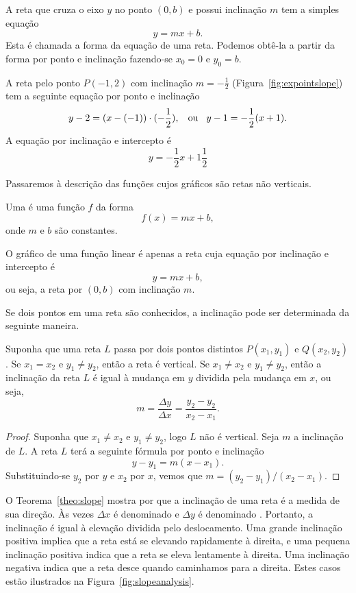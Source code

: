 \documentclass{svmono}
\begin{document}
A reta que cruza o eixo $y$ no ponto $(0,b)$ e possui inclinação $m$
tem a simples equação
\[
  y = mx + b.
\]
Esta é chamada a forma %
%
da equação de uma reta. Podemos obtê-la a partir da forma por
ponto e inclinação fazendo-se $x_0 = 0$ e $y_0 = b$.

\begin{example}
A reta pelo ponto $P(-1,2)$ com inclinação $m = - \frac{1}{2}$
(Figura~\ref{fig:expointslope}) tem a seguinte equação por
ponto e inclinação
\[
  y-2 = (x - (-1))\cdot(-\frac{1}{2}), \hspace{2ex} \text{ou}
  \hspace{2ex} y-1 = -\frac{1}{2}(x+1).
\]
A equação por inclinação e intercepto é
\[
  y = -\frac{1}{2}x + 1\frac{1}{2}
\]
\end{example}


Passaremos à descrição das funções cujos gráficos são retas não verticais.

\begin{defin}
Uma  é uma função $f$ da forma
\[
  f(x) = mx+b,
\]
onde $m$ e $b$ são constantes.
\end{defin}

O gráfico de uma função linear é apenas a reta cuja equação por
inclinação e intercepto é
\[
  y = mx+b,
\]
ou seja, a reta por $(0,b)$ com inclinação $m$.

Se dois pontos em uma reta são conhecidos, a inclinação pode ser
determinada da seguinte maneira.

\begin{theorem}
\label{theo:slope}
Suponha que uma reta $L$ passa por dois pontos distintos $P(x_1,y_1)$
e $Q(x_2,y_2)$. Se $x_1 = x_2$ e $y_1 \ne y_2$, então a reta é vertical.
Se $x_1 \ne x_2$ e $y_1 \ne y_2$, então a inclinação da reta $L$ é
igual à mudança em $y$ dividida pela mudança em $x$, ou seja,
\[
  m = \frac{\Delta y}{\Delta x} = \frac{y_2 - y_2}{x_2 - x_1}.
\]
\end{theorem}

\begin{proof}
Suponha que $x_1 \ne x_2$ e $y_1 \ne y_2$, logo $L$ não é vertical. Seja
$m$ a inclinação de $L$. A reta $L$ terá a seguinte fórmula por ponto e
inclinação
\[
  y - y_1 = m (x-x_1).
\]
Substituindo-se $y_2$ por $y$ e $x_2$ por $x$, vemos que
$m = (y_2 - y_1)/(x_2 - x_1)$.
\end{proof}

O Teorema~\ref{theo:slope} mostra por que a inclinação de uma
reta é a medida de sua direção. Às vezes $\Delta x$ é denominado
 e $\Delta y$ é denominado
. Portanto, a inclinação é igual à elevação
dividida pelo deslocamento. Uma grande inclinação positiva
implica que a reta está se elevando rapidamente à direita,
e uma pequena inclinação positiva indica que a reta se eleva
lentamente à direita. Uma inclinação negativa indica que a
reta desce quando caminhamos para a direita. Estes casos estão
ilustrados na Figura~\ref{fig:slopeanalysis}.
\end{document}
